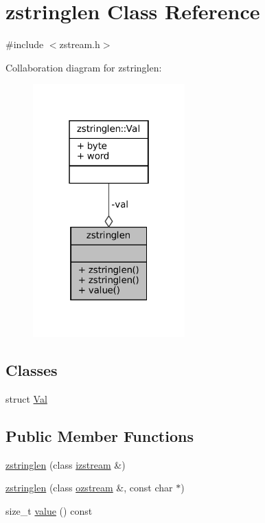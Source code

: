 \hypertarget{classzstringlen}{}\section{zstringlen Class Reference}
\label{classzstringlen}


{\ttfamily \#include $<$zstream.\+h$>$}



Collaboration diagram for zstringlen\+:
\nopagebreak
\begin{figure}[H]
\begin{center}
\leavevmode
\includegraphics[width=166pt]{classzstringlen__coll__graph}
\end{center}
\end{figure}
\subsection*{Classes}
\begin{DoxyCompactItemize}
\item 
struct \mbox{\hyperlink{classzstringlen_structzstringlen_1_1_val}{Val}}
\end{DoxyCompactItemize}
\subsection*{Public Member Functions}
\begin{DoxyCompactItemize}
\item 
\mbox{\hyperlink{classzstringlen_ae616a813b06db3cabf2affabf3daab75}{zstringlen}} (class \mbox{\hyperlink{classizstream}{izstream}} \&)
\item 
\mbox{\hyperlink{classzstringlen_adc39dd75c544f35a3c56f74b405602d2}{zstringlen}} (class \mbox{\hyperlink{classozstream}{ozstream}} \&, const char $\ast$)
\item 
size\+\_\+t \mbox{\hyperlink{classzstringlen_a4027f6245694bc4ac5ca2f4719aa2982}{value}} () const
\end{DoxyCompactItemize}
